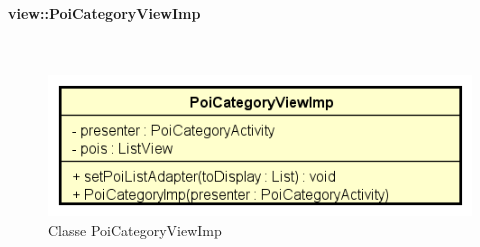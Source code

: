 \documentclass[../DefinizioneDiProdotto.tex]{subfiles}
\begin{document}
\paragraph{view::PoiCategoryViewImp}
\
\begin{figure}[H]
	\centering
	\includegraphics[width=\maxwidth]{img/PoiCategoryViewImp.png}
	\caption{Classe PoiCategoryViewImp}\label{fig:view::PoiCategoryViewImp} 
\end{figure}
\end{document}
